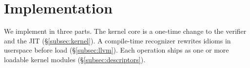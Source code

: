 







\section{Implementation}
\label{sec:implementation}

We implement \tool in three parts.
The kernel core is a one-time change to the verifier and the JIT (\S\ref{subsec:kernel}).
A compile-time recognizer rewrites idioms in userspace before load (\S\ref{subsec:llvm}).
Each operation ships as one or more loadable kernel modules (\S\ref{subsec:descriptors}).

